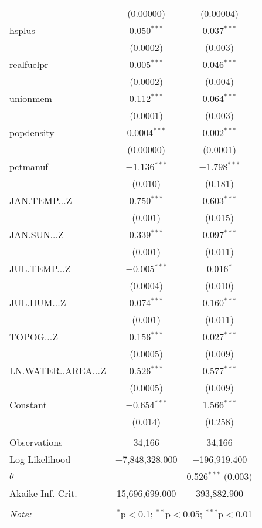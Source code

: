 \begin{table}[!htbp]
\begin{tabular}{@{\extracolsep{5pt}}lcc}
  & (0.00000) & (0.00004) \\ 
  hsplus & 0.050$^{***}$ & 0.037$^{***}$ \\ 
  & (0.0002) & (0.003) \\ 
  realfuelpr & 0.005$^{***}$ & 0.046$^{***}$ \\ 
  & (0.0002) & (0.004) \\ 
  unionmem & 0.112$^{***}$ & 0.064$^{***}$ \\ 
  & (0.0001) & (0.003) \\ 
  popdensity & 0.0004$^{***}$ & 0.002$^{***}$ \\ 
  & (0.00000) & (0.0001) \\ 
  pctmanuf & $-$1.136$^{***}$ & $-$1.798$^{***}$ \\ 
  & (0.010) & (0.181) \\ 
  JAN.TEMP...Z & 0.750$^{***}$ & 0.603$^{***}$ \\ 
  & (0.001) & (0.015) \\ 
  JAN.SUN...Z & 0.339$^{***}$ & 0.097$^{***}$ \\ 
  & (0.001) & (0.011) \\ 
  JUL.TEMP...Z & $-$0.005$^{***}$ & 0.016$^{*}$ \\ 
  & (0.0004) & (0.010) \\ 
  JUL.HUM...Z & 0.074$^{***}$ & 0.160$^{***}$ \\ 
  & (0.001) & (0.011) \\ 
  TOPOG...Z & 0.156$^{***}$ & 0.027$^{***}$ \\ 
  & (0.0005) & (0.009) \\ 
  LN.WATER..AREA...Z & 0.526$^{***}$ & 0.577$^{***}$ \\ 
  & (0.0005) & (0.009) \\ 
  Constant & $-$0.654$^{***}$ & 1.566$^{***}$ \\ 
  & (0.014) & (0.258) \\ 
 \hline \\[-1.8ex] 
Observations & 34,166 & 34,166 \\ 
Log Likelihood & $-$7,848,328.000 & $-$196,919.400 \\ 
$\theta$ &  & 0.526$^{***}$  (0.003) \\ 
Akaike Inf. Crit. & 15,696,699.000 & 393,882.900 \\ 
\hline 
\hline \\[-1.8ex] 
\textit{Note:}  & \multicolumn{2}{r}{$^{*}$p$<$0.1; $^{**}$p$<$0.05; $^{***}$p$<$0.01} \\ 
\end{tabular} 
\end{table} 
